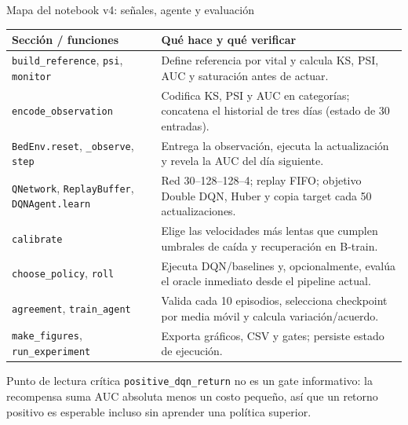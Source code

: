 \documentclass[aspectratio=169,10pt]{beamer}
\begin{document}
\begin{frame}{Mapa del notebook v4: señales, agente y evaluación}
\scriptsize
\begin{tabular}{p{}p{}}
\toprule
\textbf{Sección / funciones} & \textbf{Qué hace y qué verificar} \\
\midrule
\texttt{build\_reference}, \texttt{psi}, \texttt{monitor} & Define referencia por vital y calcula KS, PSI, AUC y saturación antes de actuar. \\
\texttt{encode\_observation} & Codifica KS, PSI y AUC en categorías; concatena el historial de tres días (estado de 30 entradas). \\
\texttt{BedEnv.reset}, \texttt{\_observe}, \texttt{step} & Entrega la observación, ejecuta la actualización y revela la AUC del día siguiente. \\
\texttt{QNetwork}, \texttt{ReplayBuffer}, \texttt{DQNAgent.learn} & Red 30--128--128--4; replay FIFO; objetivo Double DQN, Huber y copia target cada 50 actualizaciones. \\
\texttt{calibrate} & Elige las velocidades más lentas que cumplen umbrales de caída y recuperación en B-train. \\
\texttt{choose\_policy}, \texttt{roll} & Ejecuta DQN/baselines y, opcionalmente, evalúa el oracle inmediato desde el pipeline actual. \\
\texttt{agreement}, \texttt{train\_agent} & Valida cada 10 episodios, selecciona checkpoint por media móvil y calcula variación/acuerdo. \\
\texttt{make\_figures}, \texttt{run\_experiment} & Exporta gráficos, CSV y gates; persiste estado de ejecución. \\
\bottomrule
\end{tabular}
\vspace{0.2em}
\begin{block}{Punto de lectura crítica}
\texttt{positive\_dqn\_return} no es un gate informativo: la recompensa suma AUC
absoluta menos un costo pequeño, así que un retorno positivo es esperable
incluso sin aprender una política superior.
\end{block}
\end{frame}
\end{document}
